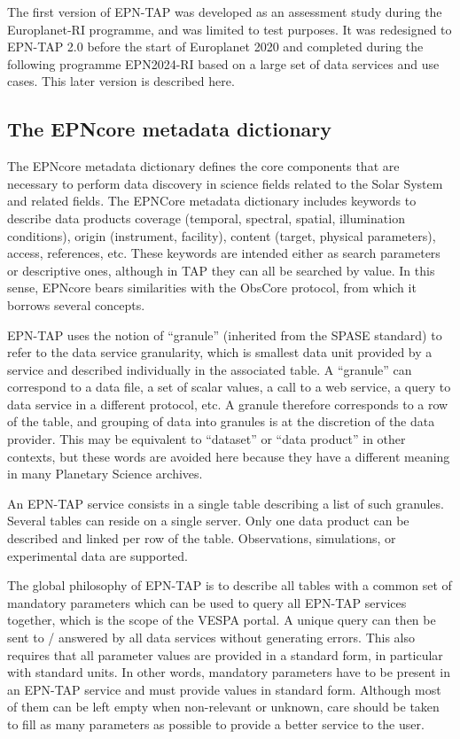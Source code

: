 \documentclass[11pt,a4paper]{ivoa}
\begin{document}
The first version of EPN-TAP was developed as an assessment study during the Europlanet-RI programme, and was limited to test purposes. It was redesigned to EPN-TAP 2.0 before the start of Europlanet 2020 and completed during the following programme EPN2024-RI based on a large set of data services and use cases. This later version is described here.


\subsection{The EPNcore metadata dictionary}

The EPNcore metadata dictionary defines the core components that are necessary to perform data discovery in science fields related to the Solar System and related fields. The EPNCore metadata dictionary includes keywords to describe data products coverage (temporal, spectral, spatial, illumination conditions), origin (instrument, facility), content (target, physical parameters), access, references, etc. These keywords are intended either as search parameters or descriptive ones, although in TAP they can all be searched by value. In this sense, EPNcore bears similarities with the ObsCore protocol, from which it borrows several concepts. 

EPN-TAP uses the notion of ``granule'' (inherited from the SPASE standard) to refer to the data service granularity, which is smallest data unit provided by a service and described individually in the associated table. A ``granule'' can correspond to a data file, a set of scalar values, a call to a web service, a query to data service in a different protocol, etc. A granule therefore corresponds to a row of the table, and grouping of data into granules is at the discretion of the data provider. This may be equivalent to ``dataset'' or ``data product'' in other contexts, but these words are avoided here because they have a different meaning in many Planetary Science archives.

An EPN-TAP service consists in a single table describing a list of such granules. Several tables can reside on a single server. Only one data product can be described and linked per row of the table. Observations, simulations, or experimental data are supported. 

The global philosophy of EPN-TAP is to describe all tables with a common set of mandatory parameters which can be used to query all EPN-TAP services together, which is the scope of the VESPA portal. A unique query can then be sent to / answered by all data services without generating errors. This also requires that all parameter values are provided in a standard form, in particular with standard units. In other words, mandatory parameters have to be present in an EPN-TAP service and must provide values in standard form. Although most of them can be left empty when non-relevant or unknown, care should be taken to fill as many parameters as possible to provide a better service to the user.  
\end{document}
